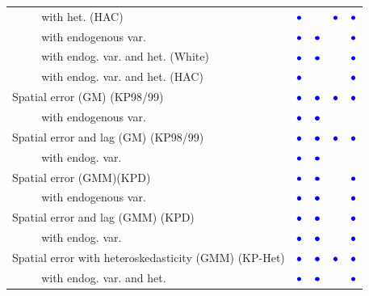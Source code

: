 \documentclass{article}
\begin{document}
\begin{table}[htpb]
\begin{small}
\begin{tabular}{l|cccc}
\textcolor{white}{XXX} with het. (HAC)&{\LARGE$\textcolor{blue}\bullet$}&&{\LARGE$\textcolor{blue}\bullet$}&{\LARGE$\textcolor{blue}\bullet$}\\
\textcolor{white}{XXX} with endogenous var.&{\LARGE$\textcolor{blue}\bullet$}&{\LARGE$\textcolor{blue}\bullet$}&&{\LARGE$\textcolor{blue}\bullet$}\\
\textcolor{white}{XXX} with endog. var. and het. (White)&{\LARGE$\textcolor{blue}\bullet$}&{\LARGE$\textcolor{blue}\bullet$}&&{\LARGE$\textcolor{blue}\bullet$}\\
\textcolor{white}{XXX} with endog. var. and het. (HAC) &{\LARGE$\textcolor{blue}\bullet$}&&&{\LARGE$\textcolor{blue}\bullet$}\\
Spatial error (GM) (KP98/99)&{\LARGE$\textcolor{blue}\bullet$}&{\LARGE$\textcolor{blue}\bullet$}&{\LARGE$\textcolor{blue}\bullet$}&{\LARGE$\textcolor{blue}\bullet$}\\
\textcolor{white}{XXX} with endogenous var. &{\LARGE$\textcolor{blue}\bullet$}&{\LARGE$\textcolor{blue}\bullet$}&&\\
Spatial error and lag (GM) (KP98/99)&{\LARGE$\textcolor{blue}\bullet$}&{\LARGE$\textcolor{blue}\bullet$}&{\LARGE$\textcolor{blue}\bullet$}&{\LARGE$\textcolor{blue}\bullet$}\\
\textcolor{white} {XXX} with endog. var. &{\LARGE$\textcolor{blue}\bullet$}&{\LARGE$\textcolor{blue}\bullet$}&&\\
Spatial error (GMM)(KPD)&{\LARGE$\textcolor{blue}\bullet$}&{\LARGE$\textcolor{blue}\bullet$}&&{\LARGE$\textcolor{blue}\bullet$}\\
\textcolor{white}{XXX} with endogenous var. &{\LARGE$\textcolor{blue}\bullet$}&{\LARGE$\textcolor{blue}\bullet$}&&{\LARGE$\textcolor{blue}\bullet$}\\
Spatial error and lag (GMM) (KPD)&{\LARGE$\textcolor{blue}\bullet$}&{\LARGE$\textcolor{blue}\bullet$}&&{\LARGE$\textcolor{blue}\bullet$}\\
\textcolor{white}{XXX} with endog. var. &{\LARGE$\textcolor{blue}\bullet$}&{\LARGE$\textcolor{blue}\bullet$}&&{\LARGE$\textcolor{blue}\bullet$}\\
Spatial error with heteroskedasticity (GMM) (KP-Het)&{\LARGE$\textcolor{blue}\bullet$}&{\LARGE$\textcolor{blue}\bullet$}&{\LARGE$\textcolor{blue}\bullet$}&{\LARGE$\textcolor{blue}\bullet$}\\
\textcolor{white}{XXX} with endog. var. and het. &{\LARGE$\textcolor{blue}\bullet$}&{\LARGE$\textcolor{blue}\bullet$}&&{\LARGE$\textcolor{blue}\bullet$}\\

\end{tabular}
\end{small}
\end{table}
\end{document}
